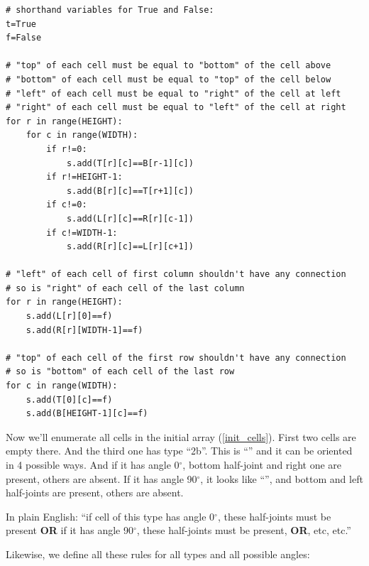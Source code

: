 \begin{lstlisting}
# shorthand variables for True and False:
t=True
f=False

# "top" of each cell must be equal to "bottom" of the cell above
# "bottom" of each cell must be equal to "top" of the cell below
# "left" of each cell must be equal to "right" of the cell at left
# "right" of each cell must be equal to "left" of the cell at right
for r in range(HEIGHT):
    for c in range(WIDTH):
        if r!=0:
            s.add(T[r][c]==B[r-1][c])
        if r!=HEIGHT-1:
            s.add(B[r][c]==T[r+1][c])
        if c!=0:
            s.add(L[r][c]==R[r][c-1])
        if c!=WIDTH-1:
            s.add(R[r][c]==L[r][c+1])

# "left" of each cell of first column shouldn't have any connection
# so is "right" of each cell of the last column
for r in range(HEIGHT):
    s.add(L[r][0]==f)
    s.add(R[r][WIDTH-1]==f)

# "top" of each cell of the first row shouldn't have any connection
# so is "bottom" of each cell of the last row
for c in range(WIDTH):
    s.add(T[0][c]==f)
    s.add(B[HEIGHT-1][c]==f)
\end{lstlisting}

Now we'll enumerate all cells in the initial array (\ref{init_cells}).
First two cells are empty there. And the third one has type ``2b''.
This is ``'' %
and it can be oriented in 4 possible ways.
And if it has angle 0$^{\circ}$, bottom half-joint and right one are present, others are absent.
If it has angle 90$^{\circ}$, it looks like 
``'', %
and bottom and left half-joints are present, others are absent.

In plain English: ``if cell of this type has angle 0$^{\circ}$, these half-joints must be present \textbf{OR}
if it has angle 90$^{\circ}$, these half-joints must be present, \textbf{OR}, etc, etc.''

Likewise, we define all these rules for all types and all possible angles:

